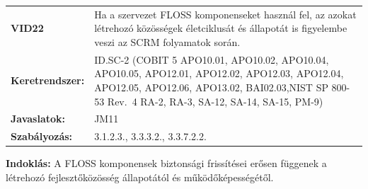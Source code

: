 \documentclass[12pt,magyar,a4paper,oneside]{scrreprt}
\begin{document}
\begin{longtable}[]{@{}ll@{}}
\toprule
\endhead
\begin{minipage}[t]{0.16\columnwidth}\raggedright
\textbf{VID22}\strut
\end{minipage} & \begin{minipage}[t]{0.79\columnwidth}\raggedright
Ha a szervezet FLOSS komponenseket használ fel, az azokat létrehozó
közösségek életciklusát és állapotát is figyelembe veszi az SCRM
folyamatok során.\strut
\end{minipage}\tabularnewline
\begin{minipage}[t]{0.16\columnwidth}\raggedright
\textbf{Keretrendszer:}\strut
\end{minipage} & \begin{minipage}[t]{0.79\columnwidth}\raggedright
ID.SC-2 (COBIT 5 APO10.01, APO10.02, APO10.04, APO10.05, APO12.01,
APO12.02, APO12.03, APO12.04, APO12.05, APO12.06, APO13.02,
BAI02.03,NIST SP 800-53 Rev.~4 RA-2, RA-3, SA-12, SA-14, SA-15,
PM-9)\strut
\end{minipage}\tabularnewline
\begin{minipage}[t]{0.16\columnwidth}\raggedright
\textbf{Javaslatok:}\strut
\end{minipage} & \begin{minipage}[t]{0.79\columnwidth}\raggedright
JM11\strut
\end{minipage}\tabularnewline
\begin{minipage}[t]{0.16\columnwidth}\raggedright
\textbf{Szabályozás:}\strut
\end{minipage} & \begin{minipage}[t]{0.79\columnwidth}\raggedright
3.1.2.3., 3.3.3.2., 3.3.7.2.2.\strut
\end{minipage}\tabularnewline
\bottomrule
\end{longtable}

\textbf{Indoklás: } A FLOSS komponensek biztonsági frissítései erősen
függenek a létrehozó fejlesztőközösség állapotától és
működőképességétől.
\end{document}
